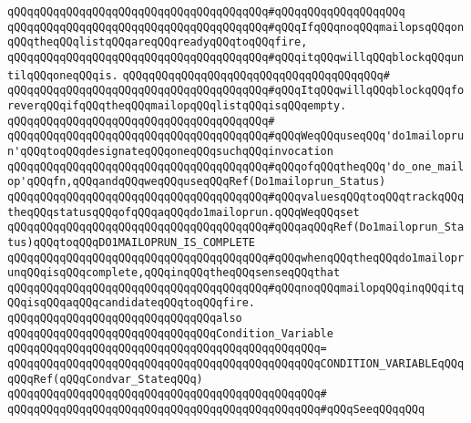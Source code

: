 \verb|qQQqqQQqqQQqqQQqqQQqqQQqqQQqqQQqqQQqqQQq#qQQqqQQqqQQqqQQqqQQq|\newline
\verb|qQQqqQQqqQQqqQQqqQQqqQQqqQQqqQQqqQQqqQQq#qQQqIfqQQqnoqQQqmailopsqQQqonqQQqtheqQQqlistqQQqareqQQqreadyqQQqtoqQQqfire,|\newline
\verb|qQQqqQQqqQQqqQQqqQQqqQQqqQQqqQQqqQQqqQQq#qQQqitqQQqwillqQQqblockqQQquntilqQQqoneqQQqis.|\newline
\verb|qQQqqQQqqQQqqQQqqQQqqQQqqQQqqQQqqQQqqQQq#|\newline
\verb|qQQqqQQqqQQqqQQqqQQqqQQqqQQqqQQqqQQqqQQq#qQQqItqQQqwillqQQqblockqQQqforeverqQQqifqQQqtheqQQqmailopqQQqlistqQQqisqQQqempty.|\newline
\verb|qQQqqQQqqQQqqQQqqQQqqQQqqQQqqQQqqQQqqQQq#|\newline
\verb|qQQqqQQqqQQqqQQqqQQqqQQqqQQqqQQqqQQqqQQq#qQQqWeqQQquseqQQq'do1mailoprun'qQQqtoqQQqdesignateqQQqoneqQQqsuchqQQqinvocation|\newline
\verb|qQQqqQQqqQQqqQQqqQQqqQQqqQQqqQQqqQQqqQQq#qQQqofqQQqtheqQQq'do_one_mailop'qQQqfn,qQQqandqQQqweqQQquseqQQqRef(Do1mailoprun_Status)|\newline
\verb|qQQqqQQqqQQqqQQqqQQqqQQqqQQqqQQqqQQqqQQq#qQQqvaluesqQQqtoqQQqtrackqQQqtheqQQqstatusqQQqofqQQqaqQQqdo1mailoprun.qQQqWeqQQqset|\newline
\verb|qQQqqQQqqQQqqQQqqQQqqQQqqQQqqQQqqQQqqQQq#qQQqaqQQqRef(Do1mailoprun_Status)qQQqtoqQQqDO1MAILOPRUN_IS_COMPLETE|\newline
\verb|qQQqqQQqqQQqqQQqqQQqqQQqqQQqqQQqqQQqqQQq#qQQqwhenqQQqtheqQQqdo1mailoprunqQQqisqQQqcomplete,qQQqinqQQqtheqQQqsenseqQQqthat|\newline
\verb|qQQqqQQqqQQqqQQqqQQqqQQqqQQqqQQqqQQqqQQq#qQQqnoqQQqmailopqQQqinqQQqitqQQqisqQQqaqQQqcandidateqQQqtoqQQqfire.|\newline
\newline
\newline
\verb|qQQqqQQqqQQqqQQqqQQqqQQqqQQqqQQqalso|\newline
\verb|qQQqqQQqqQQqqQQqqQQqqQQqqQQqqQQqCondition_Variable|\newline
\verb|qQQqqQQqqQQqqQQqqQQqqQQqqQQqqQQqqQQqqQQqqQQqqQQq=|\newline
\verb|qQQqqQQqqQQqqQQqqQQqqQQqqQQqqQQqqQQqqQQqqQQqqQQqCONDITION_VARIABLEqQQqqQQqRef(qQQqCondvar_StateqQQq)|\newline
\verb|qQQqqQQqqQQqqQQqqQQqqQQqqQQqqQQqqQQqqQQqqQQqqQQq#|\newline
\verb|qQQqqQQqqQQqqQQqqQQqqQQqqQQqqQQqqQQqqQQqqQQqqQQq#qQQqSeeqQQqqQQq|\newline
